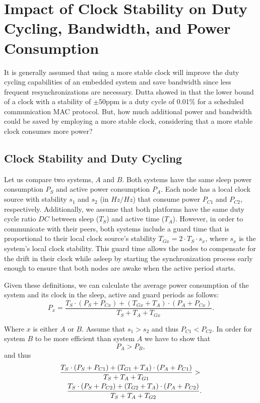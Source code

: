 \section{Impact of Clock Stability on Duty Cycling, Bandwidth, and Power Consumption}
\label{sec:power}

It is generally assumed that using a more stable clock will improve the duty
cycling capabilities of an embedded system and save bandwidth since less 
frequent resynchronizations are necessary. Dutta
showed in \cite{dutta2007procrastination} that the lower bound of a clock with
a stability of $\pm 50$ppm is a duty cycle of 0.01\% for a scheduled
communication MAC protocol. But, how much additional power and bandwidth could be saved by
employing a more stable clock, considering that a more stable clock consumes
more power? 

\subsection{Clock Stability and Duty Cycling}
Let us compare two systems, $A$ and $B$. Both systems have the same sleep power
consumption $P_S$ and active power consumption $P_A$.  Each node has a local
clock source with stability $s_1$ and $s_2$ (in $Hz/Hz$) that consume power $P_{C1}$ and $P_{C2}$,
respectively. Additionally, we assume that both platforms have the same duty
cycle ratio $DC$ between sleep ($T_S$) and active time ($T_A$). However, in order
to communicate with their peers, both systems include a guard time that is
proportional to their local clock source's stability $T_{Gx} = 2 \cdot T_S \cdot
s_x$, where $s_x$ is the system's local clock stability. This guard time
allows the nodes to compensate for the drift in their clock while asleep by starting the synchronization
process early enough to ensure that both nodes are awake when the active period starts.

Given these definitions, we can calculate the average power consumption of the
system and its clock in the sleep, active and guard periods as follows:
\begin{equation}
	P_x = \frac{T_S \cdot (P_S + P_{Cx}) + (T_{Gx} + T_A) \cdot (P_A + P_{Cx})}{T_S + T_A + T_{Gx}}.
\end{equation}

Where $x$ is either $A$ or $B$. Assume that $s_1 > s_2$ and thus $P_{C1} < P_{C2}$. In order for
system $B$ to be more efficient than system $A$ we have to show that
\begin{equation}
	P_A > P_B,
\end{equation}
and thus
\begin{eqnarray}
	\lefteqn{\frac{T_S \cdot (P_S + P_{C1}) + (T_{G1} + T_A) \cdot (P_A + P_{C1})}{T_S + T_A + T_{G1}}  > } \nonumber \\
	& & \frac{T_S \cdot (P_S + P_{C2}) + (T_{G2} + T_A) \cdot (P_A +
	P_{C2})}{T_S + T_A + T_{G2}}.\label{eq:1}
\end{eqnarray}


